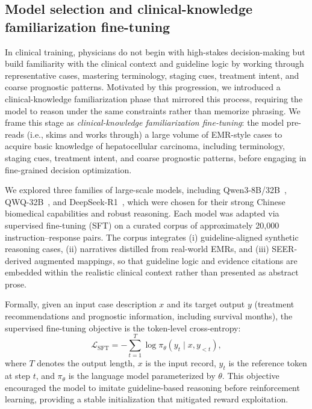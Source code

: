 \documentclass{article}
\begin{document}
\subsection{Model selection and clinical-knowledge familiarization fine-tuning}
In clinical training, physicians do not begin with high-stakes decision-making but build familiarity with the clinical context and guideline logic by working through representative cases, mastering terminology, staging cues, treatment intent, and coarse prognostic patterns. Motivated by this progression, we introduced a clinical-knowledge familiarization phase that mirrored this process, requiring the model to reason under the same constraints rather than memorize phrasing. We frame this stage as \emph{clinical-knowledge familiarization fine-tuning}: the model pre-reads (i.e., skims and works through) a large volume of EMR-style cases to acquire basic knowledge of hepatocellular carcinoma, including terminology, staging cues, treatment intent, and coarse prognostic patterns, before engaging in fine-grained decision optimization.


We explored three families of large-scale models, including Qwen3-8B/32B~\cite{qwen3_2025}, QWQ-32B~\cite{qwq32b}, and DeepSeek-R1~\cite{deepseek_r1_2025}, which were chosen for their strong Chinese biomedical capabilities and robust reasoning. Each model was adapted via supervised fine-tuning (SFT) on a curated corpus of approximately 20{,}000 instruction–response pairs. The corpus integrates (i) guideline-aligned synthetic reasoning cases, (ii) narratives distilled from real-world EMRs, and (iii) SEER-derived augmented mappings, so that guideline logic and evidence citations are embedded within the realistic clinical context rather than presented as abstract prose. 

Formally, given an input case description $x$ and its target output $y$ (treatment recommendations and prognostic information, including survival months), the supervised fine-tuning objective is the token-level cross-entropy:
\begin{equation}
    \mathcal{L}_{\text{SFT}} = - \sum_{t=1}^{T} \log \pi_{\theta}(y_t \mid x, y_{<t}),
\end{equation}
where $T$ denotes the output length, $x$ is the input record, $y_t$ is the reference token at step $t$, and $\pi_\theta$ is the language model parameterized by $\theta$. This objective encouraged the model to imitate guideline-based reasoning before reinforcement learning, providing a stable initialization that mitigated reward exploitation.
\end{document}
